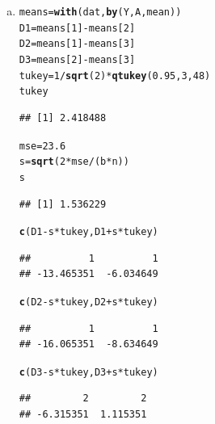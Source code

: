 \documentclass{article}\usepackage[]{graphicx}\usepackage[]{color}
\makeatletter
\newcommand{\hlnum}[1]{\textcolor[rgb]{0.686,0.059,0.569}{#1}}%
\newcommand{\hlopt}[1]{\textcolor[rgb]{0,0,0}{#1}}%
\newcommand{\hlstd}[1]{\textcolor[rgb]{0.345,0.345,0.345}{#1}}%
\newcommand{\hlkwb}[1]{\textcolor[rgb]{0.69,0.353,0.396}{#1}}%
\newcommand{\hlkwd}[1]{\textcolor[rgb]{0.737,0.353,0.396}{\textbf{#1}}}%
\newenvironment{kframe}{%
 \def\at@end@of@kframe{}%
 \ifinner\ifhmode%
  \def\at@end@of@kframe{\end{minipage}}%
  \begin{minipage}{\columnwidth}%
 \fi\fi%
 \def\FrameCommand##1{\hskip\@totalleftmargin \hskip-\fboxsep
 \colorbox{shadecolor}{##1}\hskip-\fboxsep
     \hskip-\linewidth \hskip-\@totalleftmargin \hskip\columnwidth}%
 \MakeFramed {\advance\hsize-\width
   \@totalleftmargin\z@ \linewidth\hsize
   \@setminipage}}%
 {\par\unskip\endMakeFramed%
 \at@end@of@kframe}
\newenvironment{knitrout}{}{} %
\makeatother
\begin{document}
\begin{enumerate}[(a)]

\item

\begin{knitrout}
\color{fgcolor}\begin{kframe}
\begin{alltt}
  \hlstd{means} \hlkwb{=} \hlkwd{with}\hlstd{(dat,} \hlkwd{by}\hlstd{(Y, A, mean))}
  \hlstd{D1} \hlkwb{=} \hlstd{means[}\hlnum{1}\hlstd{]} \hlopt{-} \hlstd{means[}\hlnum{2}\hlstd{]}
  \hlstd{D2} \hlkwb{=} \hlstd{means[}\hlnum{1}\hlstd{]} \hlopt{-} \hlstd{means[}\hlnum{3}\hlstd{]}
  \hlstd{D3} \hlkwb{=} \hlstd{means[}\hlnum{2}\hlstd{]} \hlopt{-} \hlstd{means[}\hlnum{3}\hlstd{]}
  \hlstd{tukey} \hlkwb{=} \hlnum{1}\hlopt{/}\hlkwd{sqrt}\hlstd{(}\hlnum{2}\hlstd{)}\hlopt{*}\hlkwd{qtukey}\hlstd{(}\hlnum{0.95}\hlstd{,} \hlnum{3}\hlstd{,} \hlnum{48}\hlstd{)}
  \hlstd{tukey}
\end{alltt}
\begin{verbatim}
## [1] 2.418488
\end{verbatim}
\begin{alltt}
  \hlstd{mse} \hlkwb{=} \hlnum{23.6}
  \hlstd{s} \hlkwb{=} \hlkwd{sqrt}\hlstd{(}\hlnum{2}\hlopt{*}\hlstd{mse}\hlopt{/}\hlstd{(b}\hlopt{*}\hlstd{n))}
  \hlstd{s}
\end{alltt}
\begin{verbatim}
## [1] 1.536229
\end{verbatim}
\begin{alltt}
  \hlkwd{c}\hlstd{(D1}\hlopt{-}\hlstd{s}\hlopt{*}\hlstd{tukey, D1}\hlopt{+}\hlstd{s}\hlopt{*}\hlstd{tukey)}
\end{alltt}
\begin{verbatim}
##          1          1 
## -13.465351  -6.034649
\end{verbatim}
\begin{alltt}
  \hlkwd{c}\hlstd{(D2}\hlopt{-}\hlstd{s}\hlopt{*}\hlstd{tukey, D2}\hlopt{+}\hlstd{s}\hlopt{*}\hlstd{tukey)}
\end{alltt}
\begin{verbatim}
##          1          1 
## -16.065351  -8.634649
\end{verbatim}
\begin{alltt}
  \hlkwd{c}\hlstd{(D3}\hlopt{-}\hlstd{s}\hlopt{*}\hlstd{tukey, D3}\hlopt{+}\hlstd{s}\hlopt{*}\hlstd{tukey)}
\end{alltt}
\begin{verbatim}
##         2         2 
## -6.315351  1.115351
\end{verbatim}
\end{kframe}
\end{knitrout}


\end{enumerate}
\end{document}
